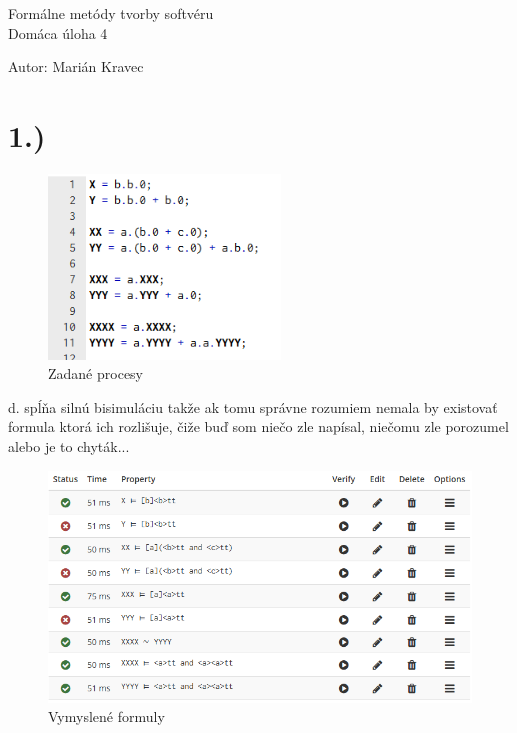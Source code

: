 \documentclass[a4paper]{article}
\begin{document}
 
	
\pagestyle{plain}

\begin{center}
	\sc\large
	Formálne metódy tvorby softvéru\\
	Domáca úloha 4 
\end{center}

Autor: Marián Kravec

\section{1.)}

\begin{figure}[!h]
	\centering
	\includegraphics[width=0.55\textwidth]{proc_1.png}
	\caption{Zadané procesy}
\end{figure}

d. spĺňa silnú bisimuláciu takže ak tomu správne rozumiem nemala by existovať formula ktorá ich rozlišuje, čiže buď som niečo zle napísal, niečomu zle porozumel alebo je to chyták...

\begin{figure}[!h]
	\centering
	\includegraphics[width=1\textwidth]{form_1.png}
	\caption{Vymyslené formuly}
\end{figure}
\end{document}
